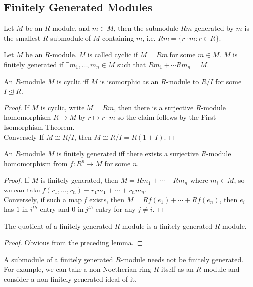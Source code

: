 \subsection{Finitely Generated Modules}
\begin{definition}
    Let $M$ be an $R$-module, and $m\in M$, then the submodule $Rm$ generated by $m$ is the smallest $R$-submodule of $M$ containing $m$, i.e. $Rm=\{r\cdot m:r\in R\}$.
\end{definition}
\begin{definition}
    Let $M$ be an $R$-module.
    $M$ is called cyclic if $M=Rm$ for some $m\in M$.
    $M$ is finitely generated if $\exists m_1,\ldots,m_n\in M$ such that $Rm_1+\cdots Rm_n=M$.
\end{definition}
\begin{lemma}
    An $R$-module $M$ is cyclic iff $M$ is isomorphic as an $R$-module to $R/I$ for some $I\unlhd R$.
\end{lemma}
\begin{proof}
    If $M$ is cyclic, write $M=Rm$, then there is a surjective $R$-module homomorphism $R\to M$ by $r\mapsto r\cdot m$ so the claim follows by the First Isomorphism Theorem.\\
    Conversely If $M\cong R/I$, then $M\cong R/I=R(1+I)$.
\end{proof}
\begin{lemma}
    An $R$-module $M$ is finitely generated iff there exists a surjective $R$-module homomorphism from $f:R^n\to M$ for some $n$.
\end{lemma}
\begin{proof}
    If $M$ is finitely generated, then $M=Rm_1+\cdots +Rm_n$ where $m_i\in M$, so we can take $f(r_1,\ldots,r_n)=r_1m_1+\cdots +r_nm_n$.\\
    Conversely, if such a map $f$ exists, then $M=Rf(e_1)+\cdots+Rf(e_n)$, then $e_i$ has $1$ in $i^{th}$ entry and $0$ in $j^{th}$ entry for any $j\neq i$.
\end{proof}
\begin{corollary}
    The quotient of a finitely generated $R$-module is a finitely generated $R$-module.
\end{corollary}
\begin{proof}
    Obvious from the preceding lemma.
\end{proof}
\begin{remark}
    A submodule of a finitely generated $R$-module needs not be finitely generated.
    For example, we can take a non-Noetherian ring $R$ itself as an $R$-module and consider a non-finitely generated ideal of it.
\end{remark}
